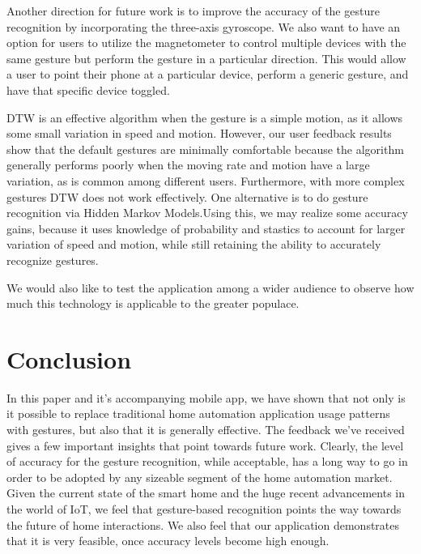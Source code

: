 \documentclass[journal]{IEEEtran}
\begin{document}
Another direction for future work is to improve the accuracy of the gesture recognition by incorporating the three-axis gyroscope. We also want to have an option for users to utilize the magnetometer to control multiple devices with the same gesture but perform the gesture in a particular direction. This would allow a user to point their phone at a particular device, perform a generic gesture, and have that specific device toggled.

DTW is an effective algorithm when the gesture is a simple motion, as it allows some small variation in speed and motion. However, our user feedback results show that the default gestures are minimally comfortable because the algorithm generally performs poorly when the moving rate and motion have a large variation, as is common among different users. Furthermore, with more complex gestures DTW does not work effectively. One alternative is to do gesture recognition via Hidden Markov Models.Using this, we may realize some accuracy gains, because it uses knowledge of probability and stastics to account for larger variation of speed and motion, while still retaining the ability to accurately recognize gestures. 

We would also like to test the application among a wider audience to observe how much this technology is applicable to the greater populace.
\section{Conclusion}

In this paper and it’s accompanying mobile app, we have shown that not only is it possible to replace traditional home automation application usage patterns with gestures, but also that it is generally effective. The feedback we’ve received gives a few important insights that point towards future work. Clearly, the level of accuracy for the gesture recognition, while acceptable, has a long way to go in order to be adopted by any sizeable segment of the home automation market. Given the current state of the smart home and the huge recent advancements in the world of IoT, we feel that gesture-based recognition points the way towards the future of home interactions. We also feel that our application demonstrates that it is very feasible, once accuracy levels become high enough. 
\end{document}
